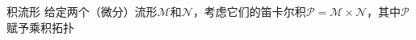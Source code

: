 \begin{definition}{积流形}
给定两个（微分）流形$\mathcal{M}$和$\mathcal{N}$，考虑它们的笛卡尔积$\mathcal{P}=\mathcal{M}\times\mathcal{N}$，其中$\mathcal{P}$赋予乘积拓扑
\end{definition}